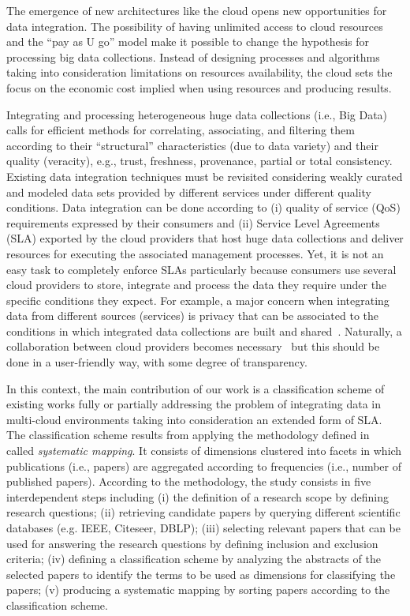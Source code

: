 The emergence of new architectures like the cloud opens new opportunities for data integration. 
The possibility of having unlimited access to cloud resources and the ``pay as U go'' model make it possible to change the hypothesis for processing big  data collections.  Instead of designing processes and algorithms taking into consideration  limitations on resources availability, the cloud sets the focus on the economic cost implied when using resources and producing results.

 
Integrating and processing heterogeneous huge data collections (i.e., Big Data) calls for efficient methods for correlating, associating, and filtering them according to their ``structural'' characteristics (due to data variety) and their quality (veracity), e.g., trust, freshness, provenance, partial or total consistency. 
Existing data integration techniques must be revisited considering weakly curated and modeled data sets provided by different services under different quality conditions. Data integration can be done according to  (i) quality of service (QoS) requirements expressed by their consumers and (ii) Service Level Agreements (SLA)  exported by the cloud providers that host  huge data collections and deliver resources for executing the associated management processes. 
Yet, it is not an easy task to completely enforce SLAs particularly because
consumers use several cloud providers to store, integrate and process the data
they require under the specific conditions they expect. For example, a major concern when
integrating data from different sources (services) is privacy that can be
associated to the conditions in which integrated data collections are built and
shared~\cite{YauY08}.     
Naturally, a collaboration between cloud providers becomes necessary~\cite{036}
but this should be  done in a user-friendly way, with some degree of
transparency. 

In this context, the main contribution of our work is
 a classification scheme of existing works fully or partially addressing
the problem of integrating data in multi-cloud environments taking into
consideration an extended form of SLA. 
The classification scheme results from  applying the  methodology defined
in~\cite{SM:Petersen:2008} called  \textit{systematic mapping}. It consists of dimensions clustered
into facets in which publications (i.e., papers) are aggregated according to
frequencies (i.e., number of published papers). According to the methodology,
the study consists in  five interdependent steps including (i) the definition of
a research scope by defining research questions; (ii) retrieving candidate
papers by querying different scientific databases (e.g. IEEE, Citeseer, DBLP);
(iii) selecting relevant papers that can be used for answering the research
questions by defining inclusion and exclusion criteria; (iv) defining a
classification scheme by analyzing the abstracts of the selected papers to
identify the terms to be used as dimensions for classifying the papers;
(v) producing a systematic mapping by sorting papers according to the
classification scheme.              

